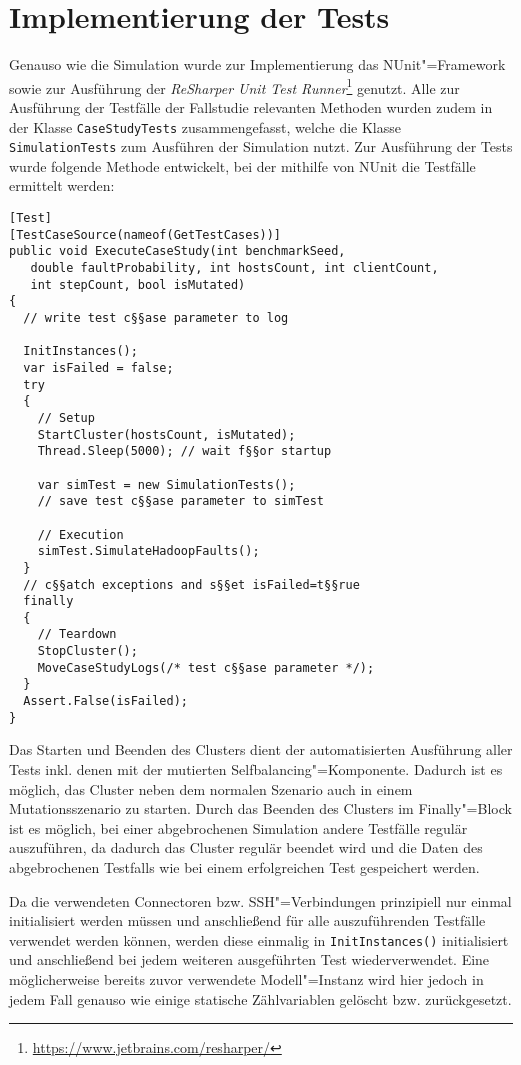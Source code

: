 \section{Implementierung der Tests}
\label{sec:implTestcases}

Genauso wie die Simulation wurde zur Implementierung das NUnit"=Framework sowie zur Ausführung der \emph{ReSharper Unit Test Runner}\footnote{\url{https://www.jetbrains.com/resharper/}} genutzt.
Alle zur Ausführung der Testfälle der Fallstudie relevanten Methoden wurden zudem in der Klasse \texttt{CaseStudyTests} zusammengefasst, welche die Klasse \texttt{SimulationTests} zum Ausführen der Simulation nutzt.
Zur Ausführung der Tests wurde folgende Methode entwickelt, bei der mithilfe von NUnit die Testfälle ermittelt werden:

\begin{lstlisting}[label=lst:executeTestCases,style=cs,
caption={[Methode zur Ausführung der Tests der Fallstudie]
    Methode zur Ausführung der Tests der Fallstudie (gekürzt)}]
[Test]
[TestCaseSource(nameof(GetTestCases))]
public void ExecuteCaseStudy(int benchmarkSeed,
   double faultProbability, int hostsCount, int clientCount,
   int stepCount, bool isMutated)
{
  // write test c§§ase parameter to log
  
  InitInstances();
  var isFailed = false;
  try
  {
    // Setup
    StartCluster(hostsCount, isMutated);
    Thread.Sleep(5000); // wait f§§or startup
    
    var simTest = new SimulationTests();
    // save test c§§ase parameter to simTest
    
    // Execution
    simTest.SimulateHadoopFaults();
  }
  // c§§atch exceptions and s§§et isFailed=t§§rue
  finally
  {
    // Teardown
    StopCluster();
    MoveCaseStudyLogs(/* test c§§ase parameter */);
  }
  Assert.False(isFailed);
}
\end{lstlisting}

Das Starten und Beenden des Clusters dient der automatisierten Ausführung aller Tests inkl. denen mit der mutierten Selfbalancing"=Komponente.
Dadurch ist es möglich, das Cluster neben dem normalen Szenario auch in einem Mutationsszenario zu starten.
Durch das Beenden des Clusters im Finally"=Block ist es möglich, bei einer abgebrochenen Simulation andere Testfälle regulär auszuführen, da dadurch das Cluster regulär beendet wird und die Daten des abgebrochenen Testfalls wie bei einem erfolgreichen Test gespeichert werden.

Da die verwendeten Connectoren bzw. SSH"=Verbindungen prinzipiell nur einmal initialisiert werden müssen und anschließend für alle auszuführenden Testfälle verwendet werden können, werden diese einmalig in \texttt{InitInstances()} initialisiert und anschließend bei jedem weiteren ausgeführten Test wiederverwendet.
Eine möglicherweise bereits zuvor verwendete Modell"=Instanz wird hier jedoch in jedem Fall genauso wie einige statische Zählvariablen gelöscht bzw. zurückgesetzt.

